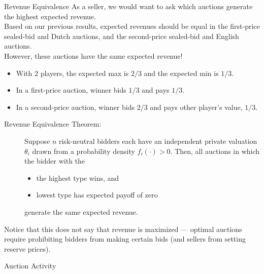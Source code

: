 \documentclass[10pt]{extarticle}
\begin{document}
  \begin{problem}{Revenue Equivalence}
    As a seller, we would want to ask which auctions generate the highest expected revenue.\\

    Based on our previous results, expected revenues should be equal in the first-price sealed-bid and Dutch auctions, and the second-price sealed-bid and English auctions.\\

    However, these auctions have the same expected revenue!
    \begin{itemize}
      \item With $2$ players, the expected max is $2/3$ and the expected min is $1/3$.
      \item In a first-price auction, winner bids $1/3$ and pays $1/3$.
      \item In a second-price auction, winner bids $2/3$ and pays other player's value, $1/3$.
    \end{itemize}
    \begin{description}
      \item[Revenue Equivalence Theorem:] Suppose $n$ risk-neutral bidders each have an independent private valuation $\theta_i$ drawn from a probability density $f_i(\cdot) > 0$. Then, all auctions in which the bidder with the
        \begin{itemize}
          \item the highest type wins, and
          \item lowest type has expected payoff of zero
        \end{itemize}
        generate the same expected revenue.
    \end{description}
    Notice that this does not say that revenue is maximized --- optimal auctions require prohibiting bidders from making certain bids (and sellers from setting reserve prices).
  \end{problem}
  \begin{problem}{Auction Activity}
    \begin{tcbraster}[raster columns = 2, sharp corners, colframe = black!75!white,colback=white]
    \end{tcbraster}
  \end{problem}
\end{document}
